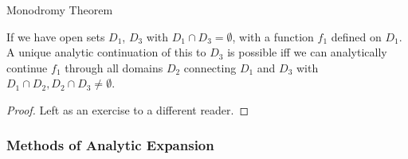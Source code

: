 \documentclass[a4paper]{article}
\begin{document}
 \begin{prop} Monodromy Theorem

	 If we have open sets $D_1$, $D_3$ with $D_1 \cap D_3 = \emptyset$, with a function $f_1$ defined on $D_1$. A unique analytic continuation of this to $D_3$ is possible iff we can analytically continue $f_1$ through all domains $D_2$ connecting $D_1$ and $D_3$ with $D_1 \cap D_2, D_2 \cap D_3 \neq \emptyset$.	 
\end{prop}

\begin{proof}
	Left as an exercise to a different reader.
\end{proof}

\subsubsection*{Methods of Analytic Expansion}
\end{document}
